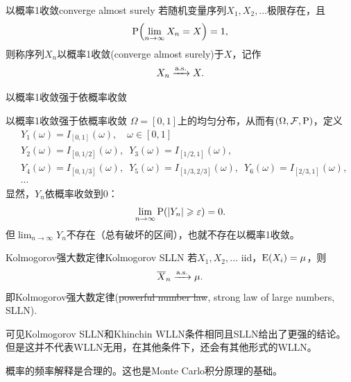 
\begin{definition}{以概率1收敛}{converge almost surely}
	若随机变量序列$X_1,X_2,\ldots$极限存在，且
	\begin{equation}
		\operatorname{P}\Bigl(\lim_{n\to\infty}X_n = X\Bigr) = 1,
	\end{equation}
	则称序列$X_n$以概率1收敛(converge almost surely)于$X$，记作
	\[
		X_n \xrightarrow{\text{a.s.}} X.
	\]
\end{definition}

\begin{corollary}
	以概率1收敛强于依概率收敛
\end{corollary}

\begin{example}{以概率1收敛强于依概率收敛}{}
	$\Omega = [0,1]$上的均匀分布，从而有$(\Omega,\mathcal F,\operatorname{P})$，定义
	\begin{align*}
		&Y_1(\omega) = I_{[0,1]}(\omega),\quad\omega \in [0,1]\\
		&Y_2(\omega) = I_{[0,1/2]}(\omega),\enspace Y_3(\omega) = I_{[1/2,1]}(\omega),\\
		&Y_4(\omega) = I_{[0,1/3]}(\omega),\enspace Y_5(\omega) = I_{[1/3,2/3]}(\omega),\enspace Y_6(\omega) = I_{[2/3,1]}(\omega),\\
		&\cdots
	\end{align*}
	显然，$Y_n$依概率收敛到0：
	\[
		\lim_{n\to\infty}\operatorname{P}(\lvert Y_n\rvert \geqslant \varepsilon) = 0.
	\]
	但$\textstyle\lim_{n\to\infty}Y_n$不存在（总有破坏的区间），也就不存在以概率1收敛。
\end{example}

\begin{theorem}{Kolmogorov强大数定律}{Kolmogorov SLLN}
	若$X_1,X_2,\ldots$ iid，$\operatorname{E}(X_i) = \mu$，则
	\begin{equation}
		\overline{X}_n \xrightarrow{\text{a.s.}} \mu.
	\end{equation}
	即Kolmogorov强大数定律(\sout{powerful number law}, strong law of large numbers, SLLN).
\end{theorem}

\begin{remark}
	可见Kolmogorov SLLN和Khinchin WLLN条件相同且SLLN给出了更强的结论。
	但是这并不代表WLLN无用，在其他条件下，还会有其他形式的WLLN。
\end{remark}

\begin{corollary}
	概率的频率解释是合理的。这也是Monte Carlo积分原理的基础。
\end{corollary}


